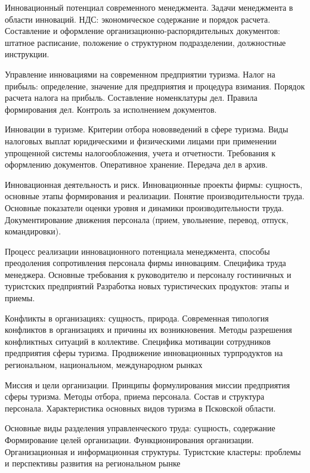 \documentclass[
	11pt,
	a4paper,
	]
	{article}
\begin{document}
\noindent{} 
	{
		Инновационный потенциал современного менеджмента. Задачи менеджмента в области инноваций.
	}{
		НДС: экономическое содержание и порядок расчета.
	}{
		Составление и оформление организационно-распорядительных документов: штатное расписание, положение о структурном подразделении, должностные инструкции.
	}

\bigskip

\noindent{} 
	{
		Управление инновациями на современном предприятии туризма.
	}{
		Налог на прибыль: определение, значение для предприятия и процедура взимания. Порядок расчета налога на прибыль.
	}{
		Составление номенклатуры дел. Правила формирования дел. Контроль за исполнением документов.
	}

\bigskip

\noindent{} 
	{
		Инновации в туризме. Критерии отбора нововведений в сфере туризма.
	}{
		Виды налоговых выплат юридическими и физическими лицами при применении упрощенной системы налогообложения, учета и отчетности.
	}{
		Требования к оформлению документов. Оперативное хранение. Передача дел в архив.
	}

\bigskip

\noindent{} 
	{
		Инновационная деятельность и риск. Инновационные проекты фирмы: сущность, основные этапы формирования и реализации.
	}{
		Понятие производительности труда. Основные показатели оценки уровня и динамики производительности труда.
	}{
		Документирование движения персонала (прием, увольнение, перевод, отпуск, командировки).
	}

\bigskip

\noindent{} 
	{
		Процесс реализации инновационного потенциала менеджмента, способы преодоления сопротивления персонала фирмы инновациям.
	}{
		Специфика труда менеджера. Основные требования к руководителю и персоналу гостиничных и туристских предприятий
	}{
		Разработка новых туристических продуктов: этапы и приемы.
	}

\bigskip

\noindent{} 
	{
		Конфликты в организациях: сущность, природа. Современная типология конфликтов в организациях и причины их возникновения. Методы разрешения конфликтных ситуаций в коллективе.
	}{
		Специфика мотивации сотрудников предприятия сферы туризма.
	}{
		Продвижение инновационных турпродуктов на региональном, национальном, международном рынках
	}

\bigskip

\noindent{} 
	{
		Миссия и цели организации. Принципы формулирования миссии предприятия сферы туризма.
	}{
		Методы отбора, приема персонала. Состав и структура персонала.
	}{
		Характеристика основных видов туризма в Псковской области.
	}

\bigskip

\noindent{} 
	{
		Основные виды разделения управленческого труда: сущность, содержание
	}{
		Формирование целей организации. Функционирования организации. Организационная и информационная структуры.
	}{
		Туристские кластеры: проблемы и перспективы развития на региональном рынке
	}

\bigskip
\end{document}
